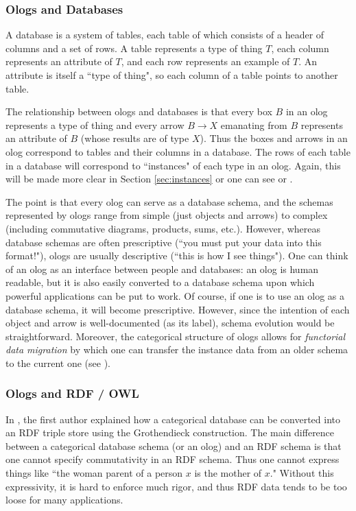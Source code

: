 \subsubsection{Ologs and Databases}

A database is a system of tables, each table of which consists of a header of columns and a set of rows. A table represents a type of thing $T$, each column represents an attribute of $T$, and each row represents an example of $T$. An attribute is itself a ``type of thing", so each column of a table points to another table. 

The relationship between ologs and databases is that every box $B$ in an olog represents a type of thing and every arrow $B\to X$ emanating from $B$ represents an attribute of $B$ (whose results are of type $X$). Thus the boxes and arrows in an olog correspond to tables and their columns in a database. The rows of each table in a database will correspond to ``instances" of each type in an olog. Again, this will be made more clear in Section \ref{sec:instances} or one can see \cite{Spi-FDM} or \cite{K:DBS}. 

The point is that every olog can serve as a database schema, and the schemas represented by ologs range from simple (just objects and arrows) to complex (including commutative diagrams, products, sums, etc.). However, whereas database schemas are often prescriptive (``you must put your data into this format!"), ologs are usually descriptive (``this is how I see things"). One can think of an olog as an interface between people and databases: an olog is human readable, but it is also easily converted to a database schema upon which powerful applications can be put to work. Of course, if one is to use an olog as a database schema, it will become prescriptive. However, since the intention of each object and arrow is well-documented (as its label), schema evolution would be straightforward. Moreover, the categorical structure of ologs allows for {\em functorial data migration} by which one can transfer the instance data from an older schema to the current one (see \cite{Spi-FDM}).


\subsubsection{Ologs and RDF / OWL}

In \cite{Spi-FDM}, the first author explained how a categorical database can be converted into an RDF triple store using the Grothendieck construction. The main difference between a categorical database schema (or an olog) and an RDF schema is that one cannot specify commutativity in an RDF schema. Thus one cannot express things like ``the woman parent of a person $x$ is the mother of $x$."  Without this expressivity, it is hard to enforce much rigor, and thus RDF data tends to be too loose for many applications. 

